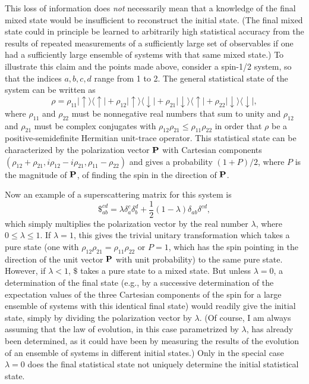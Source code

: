      This loss of information does {\it not} necessarily mean that a
knowledge
of the final mixed state would be insufficient to reconstruct the
initial
state.  (The final mixed state could in principle be learned to
arbitrarily
high statistical accuracy from the results of repeated measurements
of a
sufficiently large set of observables if one had a sufficiently large
ensemble
of systems with that same mixed state.)  To illustrate this claim and
the
points made above, consider a spin-1/2 system, so that the indices
${a,b,c,d}$
range from 1 to 2.  The general statistical state of the system can
be written
as
     	\begin{equation}
	\rho=\rho_{11}|\uparrow\rangle\langle\uparrow|
	+\rho_{12}|\uparrow\rangle\langle\downarrow|
	+\rho_{21}|\downarrow\rangle\langle\uparrow|
	+\rho_{22}|\downarrow\rangle\langle\downarrow|,
	\end{equation}
where $\rho_{11}$ and $\rho_{22}$ must be nonnegative real numbers
that sum to
unity and $\rho_{12}$ and $\rho_{21}$ must be complex conjugates with
$\rho_{12}\rho_{21} \leq \rho_{11}\rho_{22}$ in order that $\rho$ be
a
positive-semidefinite Hermitian unit-trace operator.  This
statistical state
can be characterized by the polarization vector ${\bf P}$ with
Cartesian
components
$(\rho_{12}+\rho_{21},i\rho_{12}-i\rho_{21},\rho_{11}-\rho_{22})$
and gives a probability $(1+P)/2$, where $P$ is the magnitude of
${\bf P}$, of
finding the spin in the direction of ${\bf P}$.

    Now an example of a superscattering matrix for this system is
     	\begin{equation}
	\$_{ab}^{cd} = \lambda\delta_a^c\delta_b^d +
\frac{1}{2}(1-\lambda)\delta_{ab}\delta^{cd},
	\end{equation}
 which simply multiplies the polarization vector by the real number
$\lambda$,
where $0\leq\lambda \leq 1$.  If $\lambda=1$, this gives the trivial
unitary
transformation which takes a pure state (one with $\rho_{12}\rho_{21}
=
\rho_{11}\rho_{22}$ or $P=1$, which has the spin pointing in the
direction of
the unit vector ${\bf P}$ with unit probability) to the same pure
state.
However, if $\lambda<1$, $\$$ takes a pure state to a mixed state.
But unless
$\lambda=0$, a determination of the final state (e.g., by a
successive
determination of the expectation values of the three Cartesian
components of
the spin for a large ensemble of systems with this identical final
state) would
readily give the initial state, simply by dividing the polarization
vector by
$\lambda$.  (Of course, I am always assuming that the law of
evolution, in this
case parametrized by $\lambda$, has already been determined, as it
could have
been by measuring the results of the evolution of an ensemble of
systems in
different initial states.)  Only in the special case $\lambda=0$ does
the final
statistical state not uniquely determine the initial statistical
state.

